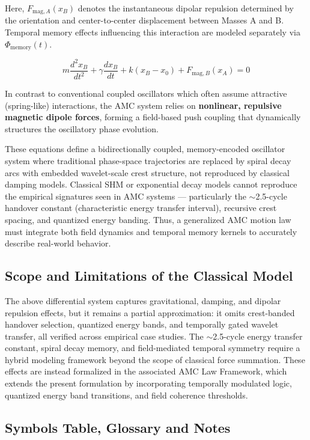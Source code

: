 \documentclass[10pt,aps,pre,onecolumn,superscriptaddress,notitlepage]{revtex4-2}
\begin{document}
Here, $F_{\text{mag},A}(x_B)$ denotes the instantaneous dipolar repulsion determined by the orientation and center-to-center displacement between Masses A and B. Temporal memory effects influencing this interaction are modeled separately via $\Phi_{\text{memory}}(t)$.

\begin{equation}
m \frac{d^2 x_B}{dt^2} + \gamma \frac{dx_B}{dt} + k(x_B - x_0) + F_{\text{mag},B}(x_A) = 0
\label{eq:massB}
\end{equation}

In contrast to conventional coupled oscillators which often assume attractive (spring-like) interactions, the AMC system relies on \textbf{nonlinear, repulsive magnetic dipole forces}, forming a field-based push coupling that dynamically structures the oscillatory phase evolution.

These equations define a bidirectionally coupled, memory-encoded oscillator system where traditional phase-space trajectories are replaced by spiral decay arcs with embedded wavelet-scale crest structure, not reproduced by classical damping models. Classical SHM or exponential decay models cannot reproduce the empirical signatures seen in AMC systems — particularly the $\sim$2.5-cycle handover constant (characteristic energy transfer interval), recursive crest spacing, and quantized energy banding. Thus, a generalized AMC motion law must integrate both field dynamics and temporal memory kernels to accurately describe real-world behavior.

\subsection{Scope and Limitations of the Classical Model}

The above differential system captures gravitational, damping, and dipolar repulsion effects, but it remains a partial approximation: it omits crest-banded handover selection, quantized energy bands, and temporally gated wavelet transfer, all verified across empirical case studies. The $\sim$2.5-cycle energy transfer constant, spiral decay memory, and field-mediated temporal symmetry require a hybrid modeling framework beyond the scope of classical force summation. These effects are instead formalized in the associated AMC Law Framework, which extends the present formulation by incorporating temporally modulated logic, quantized energy band transitions, and field coherence thresholds.

\subsection{Symbols Table, Glossary and Notes}
\end{document}
